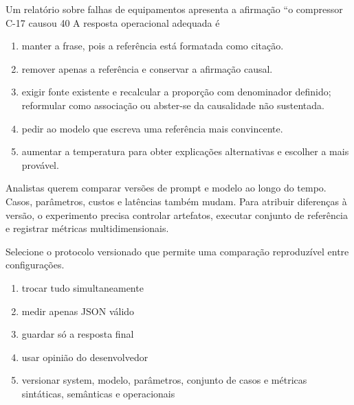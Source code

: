 \TextoBase Um relatório sobre falhas de equipamentos apresenta a afirmação ``o compressor C-17 causou 40%
\FonteDidatica
\Comando A resposta operacional adequada é
\begin{enumerate}[label=\Alph*)]
\item manter a frase, pois a referência está formatada como citação.
\item remover apenas a referência e conservar a afirmação causal.
\item exigir fonte existente e recalcular a proporção com denominador definido; reformular como associação ou abster-se da causalidade não sustentada.
\item pedir ao modelo que escreva uma referência mais convincente.
\item aumentar a temperatura para obter explicações alternativas e escolher a mais provável.
\end{enumerate}

\TextoBase

Analistas querem comparar versões de prompt e modelo ao longo do tempo. Casos, parâmetros, custos e latências também mudam. Para atribuir diferenças à versão, o experimento precisa controlar artefatos, executar conjunto de referência e registrar métricas multidimensionais.

\FonteDidatica

\Comando Selecione o protocolo versionado que permite uma comparação reproduzível entre configurações.

\begin{enumerate}[label=\Alph*)]

\item trocar tudo simultaneamente

\item medir apenas JSON válido

\item guardar só a resposta final

\item usar opinião do desenvolvedor

\item versionar system, modelo, parâmetros, conjunto de casos e métricas sintáticas, semânticas e operacionais

\end{enumerate}


